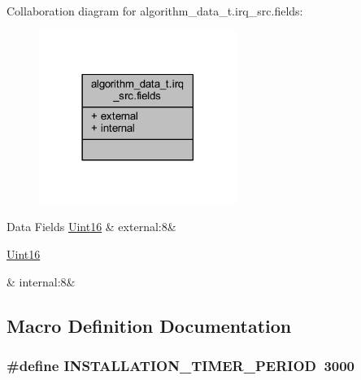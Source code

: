 Collaboration diagram for algorithm\+\_\+data\+\_\+t.\+irq\+\_\+src.\+fields\+:\nopagebreak
\begin{figure}[H]
\begin{center}
\leavevmode
\includegraphics[width=182pt]{d4/d1c/a00903}
\end{center}
\end{figure}
\begin{DoxyFields}{Data Fields}
\hypertarget{a00016_a6a21b6995a068148bbb65c8f949b3fb2}{\hyperlink{a00072_a59a9f6be4562c327cbfb4f7e8e18f08b}{Uint16}}\label{a00016_a6a21b6995a068148bbb65c8f949b3fb2}
&
external\+:8&
\\
\hline

\hypertarget{a00016_ad1efad72dc5b17dc66a46767c32fff40}{\hyperlink{a00072_a59a9f6be4562c327cbfb4f7e8e18f08b}{Uint16}}\label{a00016_ad1efad72dc5b17dc66a46767c32fff40}
&
internal\+:8&
\\
\hline

\end{DoxyFields}


\subsection{Macro Definition Documentation}
\hypertarget{a00016_a8c68dd8d7078113e9f088011171f492c}{
\subsubsection[{I\+N\+S\+T\+A\+L\+L\+A\+T\+I\+O\+N\+\_\+\+T\+I\+M\+E\+R\+\_\+\+P\+E\+R\+I\+O\+D}]{\setlength{\rightskip}{0pt plus 5cm}\#define I\+N\+S\+T\+A\+L\+L\+A\+T\+I\+O\+N\+\_\+\+T\+I\+M\+E\+R\+\_\+\+P\+E\+R\+I\+O\+D~3000}}\label{a00016_a8c68dd8d7078113e9f088011171f492c}


